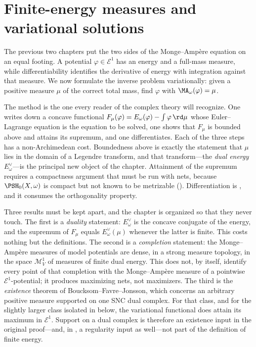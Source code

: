 \chapter{Finite-energy measures and variational solutions}
\label{chap:bfj-finite-energy-measures}

The previous two chapters put the two sides of the Monge--Amp\`ere equation
on an equal footing.  A potential \(\varphi\in\mathcal E^1\) has an energy
and a full-mass measure, while differentiability identifies the derivative of
energy with integration against that measure.  We now formulate the inverse
problem variationally: given a positive measure \(\mu\) of the correct total
mass, find \(\varphi\) with \(\MA_\omega(\varphi)=\mu\).

The method is the one every reader of the complex theory will recognize.
One writes down a concave functional
\(F_\mu(\varphi)=E_\omega(\varphi)-\int\varphi\,\rd\mu\) whose
Euler--Lagrange equation is the equation to be solved, one shows that
\(F_\mu\) is bounded above and attains its supremum, and one differentiates.
Each of the three steps has a non-Archimedean cost.  Boundedness above is
exactly the statement that \(\mu\) lies in the domain of a Legendre
transform, and that transform---the \emph{dual energy}
\(E^\vee_\omega\)---is the principal new object of the chapter.  Attainment
of the supremum requires a compactness argument that must be run with nets,
because \(\PSH_0(X,\omega)\) is compact but not known to be metrizable
().  Differentiation is
, and it consumes the orthogonality property.

Three results must be kept apart, and the chapter is organized so that they
never touch.  The first is a \emph{duality} statement: \(E^\vee_\omega\) is
the concave conjugate of the energy, and the supremum of \(F_\mu\) equals
\(E^\vee_\omega(\mu)\) whenever the latter is finite.  This costs nothing
but the definitions.  The second is a \emph{completion} statement: the
Monge--Amp\`ere measures of model potentials are dense, in a strong measure
topology, in the space \(\mathcal M^1_V\) of measures of finite dual energy.
This does not, by itself, identify every point of that completion with the
Monge--Amp\`ere measure of a pointwise \(\mathcal E^1\)-potential; it
produces maximizing nets, not maximizers.  The third is the
\emph{existence} theorem of Boucksom--Favre--Jonsson, which concerns an
arbitrary positive measure supported on one SNC dual complex.  For that
class, and for the slightly larger class isolated in
 below, the variational functional does
attain its maximum in \(\mathcal E^1\).  Support on a dual complex is
therefore an existence input in the original proof---and, in
, a regularity input as well---not part of the
definition of finite energy.

